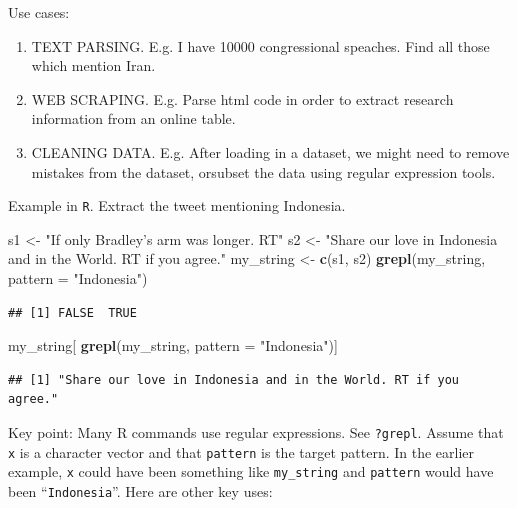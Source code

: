 \documentclass[]{book}
\newenvironment{Shaded}{\begin{snugshade}}{\end{snugshade}}
\newcommand{\KeywordTok}[1]{\textcolor[rgb]{0.13,0.29,0.53}{\textbf{#1}}}
\newcommand{\DataTypeTok}[1]{\textcolor[rgb]{0.13,0.29,0.53}{#1}}
\newcommand{\StringTok}[1]{\textcolor[rgb]{0.31,0.60,0.02}{#1}}
\newcommand{\NormalTok}[1]{#1}
\providecommand{\tightlist}{%
  \setlength{\itemsep}{0pt}\setlength{\parskip}{0pt}}
\theoremstyle{definition}
\theoremstyle{definition}
\theoremstyle{definition}
\theoremstyle{remark}
\begin{document}
Use cases:

\begin{enumerate}
\def\labelenumi{\arabic{enumi}.}
\tightlist
\item
  TEXT PARSING. E.g. I have 10000 congressional speaches. Find all those
  which mention Iran.
\item
  WEB SCRAPING. E.g. Parse html code in order to extract research
  information from an online table.
\item
  CLEANING DATA. E.g. After loading in a dataset, we might need to
  remove mistakes from the dataset, orsubset the data using regular
  expression tools.
\end{enumerate}

Example in \texttt{R}. Extract the tweet mentioning Indonesia.

\begin{Shaded}
\begin{Highlighting}[]
\NormalTok{s1 <-}\StringTok{ "If only Bradley's arm was longer. RT"}
\NormalTok{s2 <-}\StringTok{ "Share our love in Indonesia and in the World. RT if you agree."} 
\NormalTok{my_string <-}\StringTok{ }\KeywordTok{c}\NormalTok{(s1, s2)}
\KeywordTok{grepl}\NormalTok{(my_string, }\DataTypeTok{pattern =} \StringTok{"Indonesia"}\NormalTok{)}
\end{Highlighting}
\end{Shaded}

\begin{verbatim}
## [1] FALSE  TRUE
\end{verbatim}

\begin{Shaded}
\begin{Highlighting}[]
\NormalTok{my_string[ }\KeywordTok{grepl}\NormalTok{(my_string, }\DataTypeTok{pattern =} \StringTok{"Indonesia"}\NormalTok{)]}
\end{Highlighting}
\end{Shaded}

\begin{verbatim}
## [1] "Share our love in Indonesia and in the World. RT if you agree."
\end{verbatim}

Key point: Many R commands use regular expressions. See \texttt{?grepl}.
Assume that \texttt{x} is a character vector and that \texttt{pattern}
is the target pattern. In the earlier example, \texttt{x} could have
been something like \texttt{my\_string} and \texttt{pattern} would have
been ``\texttt{Indonesia}''. Here are other key uses:
\end{document}
